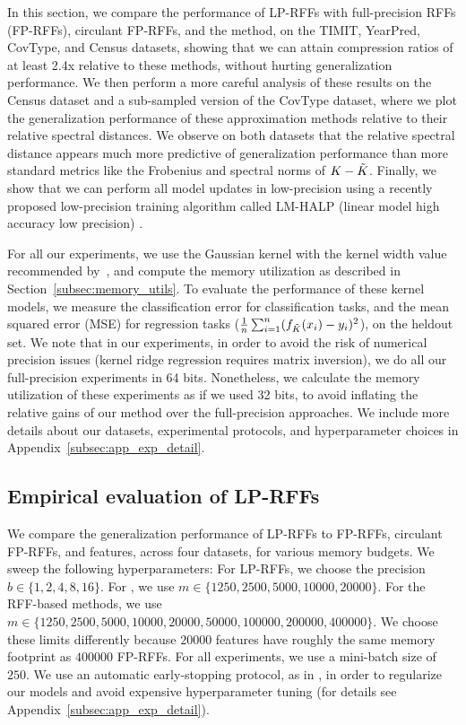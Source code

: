 In this section, we compare the performance of LP-RFFs with full-precision RFFs (FP-RFFs), circulant FP-RFFs, and the \Nystrom method, on the TIMIT, YearPred, CovType, and Census datasets, showing that we can attain compression ratios of at least 2.4x relative to these methods, without hurting generalization performance. We then perform a more careful analysis of these results on the Census dataset and a sub-sampled version of the CovType dataset, where we plot the generalization performance of these approximation methods relative to their relative spectral distances. We observe on both datasets that the relative spectral distance appears much more predictive of generalization performance than more standard metrics like the Frobenius and spectral norms of $K-\tilde{K}$. Finally, we show that we can perform all model updates in low-precision using a recently proposed low-precision training algorithm called LM-HALP (linear model high accuracy low precision) \citep{halp18}.

For all our experiments, we use the Gaussian kernel with the kernel width value recommended by~\citet{may2017}, and compute the memory utilization as described in Section~\ref{subsec:memory_utils}. To evaluate the performance of these kernel models, we measure the classification error for classification tasks, and the mean squared error (MSE) for regression tasks ($\frac{1}{n}\sum_{i=1}^n (f_{\tilde{K}}(x_i) - y_i)^2$), on the heldout set. We note that in our experiments, in order to avoid the risk of numerical precision issues (kernel ridge regression requires matrix inversion), we do all our full-precision experiments in 64 bits.  Nonetheless, we calculate the memory utilization of these experiments as if we used 32 bits, to avoid inflating the relative gains of our method over the full-precision approaches.  We include more details about our datasets, experimental protocols, and hyperparameter choices in Appendix~\ref{subsec:app_exp_detail}.\vsp

\subsection{Empirical evaluation of LP-RFFs}
\label{sec:full_run}
We compare the generalization performance of LP-RFFs to FP-RFFs, circulant FP-RFFs, and \Nystrom features, across four datasets, for various memory budgets.  We sweep the following hyperparameters: For LP-RFFs, we choose the precision $b \in \{1,2,4,8,16\}$. For \NystromNS, we use $m \in \{1250, 2500, 5000, 10000, 20000\}$.  For the RFF-based methods, we use $m\in \{1250, 2500, 5000, 10000, 20000, 50000, 100000, 200000, 400000\}$. We choose these limits differently because $\num[group-separator={,}]{20000}$ \Nystrom features have roughly the same memory footprint as $\num[group-separator={,}]{400000}$ FP-RFFs. For all experiments, we use a mini-batch size of $250$.  We use an automatic early-stopping protocol, as in \citep{morgan1990generalization,sainath2013b,sainath2013low}, in order to regularize our models \citep{zhang2005boosting,wei2017early} and avoid expensive hyperparameter tuning (for details see Appendix~\ref{subsec:app_exp_detail}).


